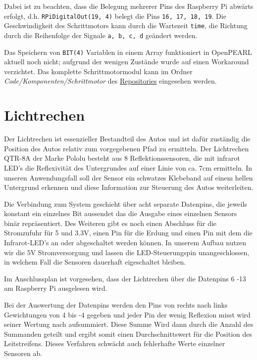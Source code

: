 Dabei ist zu beachten, dass die Belegung mehrerer Pins des Raspberry Pi abwärts erfolgt, d.h. \texttt{RPiDigitalOut(19, 4)} belegt die Pins \texttt{16, 17, 18, 19}. Die Geschwindigkeit des Schrittmotors kann durch die Wartezeit \texttt{time}, die Richtung durch die Reihenfolge der Signale \texttt{a, b, c, d} geändert werden.

Das Speichern von \texttt{BIT(4)} Variablen in einem Array funktioniert in OpenPEARL aktuell noch nicht; aufgrund der wenigen Zustände wurde auf einen Workaround verzichtet.
Das komplette Schrittmotormodul kann im Ordner \emph{Code/Komponenten/Schrittmotor} des \href{https://github.com/OpenPearl-HFUWPV1718/SensorCar}{Repositories} eingesehen werden.\\


\section{Lichtrechen}
Der Lichtrechen ist essenzieller Bestandteil des Autos und ist dafür zuständig die Position des Autos relativ zum vorgegebenen Pfad zu ermitteln. Der Lichtrechen QTR-8A der Marke Pololu besteht aus 8 Reflektionssensoren, die mit infrarot LED’s die Reflexivität des Untergrundes auf einer Linie von ca. 7cm ermitteln. In unseren Anwendungsfall soll der Sensor ein schwatzes Klebeband auf einem hellen Untergrund erkennen und diese Information zur Steuerung des Autos weiterleiten. 

Die Verbindung zum System geschieht über acht separate Datenpins, die jeweils konstant ein einzelnes Bit aussendet das die Ausgabe eines einzelnen Sensors binär repräsentiert. Des Weiteren gibt es noch einen Abschluss für die Stromzufuhr für 5 und 3.3V, einen Pin für die Erdung und einen Pin mit dem die Infrarot-LED’s an oder abgeschaltet werden können. In unserem Aufbau nutzen wir die 5V Stromversorgung und lassen die LED-Steuerungspin unangeschlossen, in welchem Fall die Sensoren dauerhaft eigeschaltet bleiben. 

Im Anschlussplan ist vorgesehen, dass der Lichtrechen über die Datenpins 6 -13 am Raspberry Pi ausgelesen wird.

Bei der Auswertung der Datenpins werden den Pins von rechts nach links Gewichtungen von 4 bis -4 gegeben und jeder Pin der wenig Reflexion misst wird seiner Wertung nach aufsummiert. Diese Summe Wird dann durch die Anzahl des Summanden geteilt und ergibt somit einen Durchschnittswert für die Position des Leitstreifens. Dieses Verfahren schwächt auch fehlerhafte Werte einzelner Sensoren ab.

